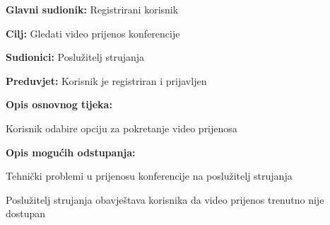 					\noindent {}
					\begin{packed_item}
						
						\item \textbf{Glavni sudionik: } Registrirani korisnik
						\item  \textbf{Cilj:} Gledati video prijenos konferencije
						\item  \textbf{Sudionici:} Poslužitelj strujanja
						\item  \textbf{Preduvjet:} Korisnik je registriran i prijavljen
						\item  \textbf{Opis osnovnog tijeka:}
						
						\item[] \begin{packed_enum}
							
							\item Korisnik odabire opciju za pokretanje video prijenosa
							
						\end{packed_enum}
						
						\item  \textbf{Opis mogućih odstupanja:}
						
						\item[] \begin{packed_item}
							
							\item[2.a] Tehnički problemi u prijenosu konferencije na poslužitelj strujanja
							\item[] \begin{packed_enum}
								
								\item Poslužitelj strujanja obavještava korisnika da video prijenos trenutno nije dostupan
								
							\end{packed_enum}
							
						\end{packed_item}
					\end{packed_item}
					
